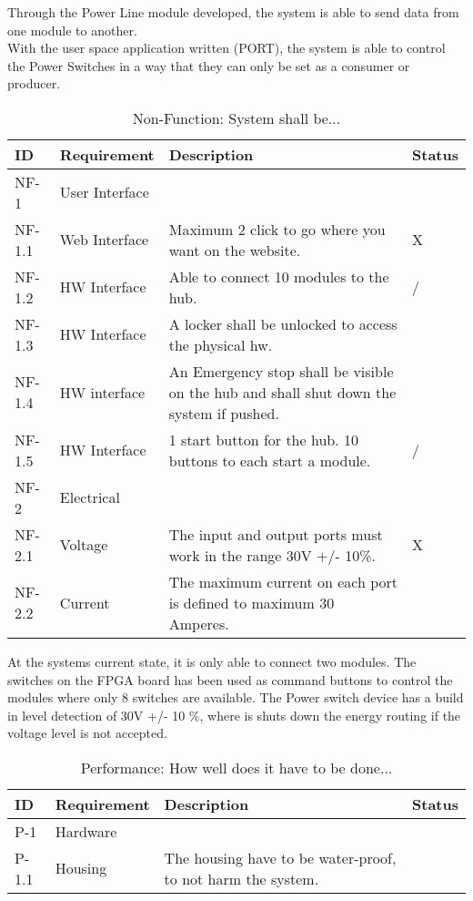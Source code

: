 Through the Power Line module developed, the system is able to send data from one module to another.
\\With the user space application written (PORT), the system is able to control the Power Switches in a way that they can only be set as a consumer or producer.
\begin{table}[H]
	\begin{tabular} [b] {| p{1.1cm} |  p{2.5cm} | p{11.0cm} | p{1.0cm} |}
	\hline
	\textbf{ID} & \textbf{Requirement} & \textbf{Description} & Status\\\hline
		NF-1 & User Interface 	& ~  & ~ \\ \hline
		NF-1.1 & Web Interface 	& Maximum 2 click to go where you want on the website. & X \\ \hline
		NF-1.2 & HW Interface	& Able to connect 10 modules to the hub. & / \\ \hline
		NF-1.3 & HW Interface	& A locker shall be unlocked to access the physical hw. & ~ \\ \hline
		NF-1.4 & HW interface	& An Emergency stop shall be visible on the hub and shall shut down the system if pushed. & ~ \\ \hline
		NF-1.5 & HW Interface	& 1 start button for the hub. 10 buttons to each start a module. & / \\ \hline
		NF-2 & Electrical 		& ~ & ~ \\ \hline
		NF-2.1 & Voltage 		& The input and output ports must work in the range 30V +/-  10\%. & X \\ \hline
		NF-2.2 & Current 		& The maximum current on each port is defined to maximum 30 Amperes. & ~ \\ \hline
	\end{tabular}
	\caption{Non-Function: System shall be...}
\end{table}
At the systems current state, it is only able to connect two modules. The switches on the FPGA board has been used as command buttons to control the modules where only 8 switches are available. The Power switch device has a build in level detection of 30V +/- 10 \%, where is shuts down the energy routing if the voltage level is not accepted.
\begin{table}[H]
	\begin{tabular} [b] {| p{1.1cm} |  p{2.5cm} | p{11.0cm} | p{1.0cm} |}
	\hline
	\textbf{ID} & \textbf{Requirement} & \textbf{Description} & Status\\\hline
		P-1 & Hardware 		&  ~ & ~ \\ \hline
		P-1.1 & Housing 		& The housing have to be water-proof, to not harm the system. & ~ \\ \hline
	\end{tabular}
	\caption{Performance: How well does it have to be done...}
\end{table}
